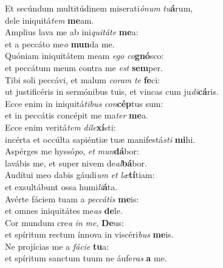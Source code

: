 \evenverse Et secúndum multitúdinem miserati\textit{ó}\textit{num} \textit{tu}\textbf{á}rum,~\*\\
\evenverse dele iniquitá\textit{tem} \textbf{me}am.\\
\oddverse Amplius lava me ab ini\textit{qui}\textit{tá}\textit{te} \textbf{me}a:~\*\\
\oddverse et a peccáto me\textit{o} \textbf{mun}da me.\\
\evenverse Quóniam iniquitátem meam \textit{e}\textit{go} \textit{co}\textbf{gnó}sco:~\*\\
\evenverse et peccátum meum contra me \textit{est} \textbf{sem}per.\\
\oddverse Tibi soli peccávi, et malum \textit{co}\textit{ram} \textit{te} \textbf{fe}ci:~\*\\
\oddverse ut justificéris in sermónibus tuis, et vincas cum ju\textit{di}\textbf{cá}ris.\\
\evenverse Ecce enim in iniquitá\textit{ti}\textit{bus} \textit{con}\textbf{cép}tus sum:~\*\\
\evenverse et in peccátis concépit me ma\textit{ter} \textbf{me}a.\\
\oddverse Ecce enim veritá\textit{tem} \textit{di}\textit{le}\textbf{xí}sti:~\*\\
\oddverse incérta et occúlta sapiéntiæ tuæ manifestá\textit{sti} \textbf{mi}hi.\\
\evenverse Aspérges me hyssó\textit{po}, \textit{et} \textit{mun}\textbf{dá}bor:~\*\\
\evenverse lavábis me, et super nivem de\textit{al}\textbf{bá}bor.\\
\oddverse Audítui meo dabis gáudi\textit{um} \textit{et} \textit{læ}\textbf{tí}tiam:~\*\\
\oddverse et exsultábunt ossa humi\textit{li}\textbf{á}ta.\\
\evenverse Avérte fáciem tuam a \textit{pec}\textit{cá}\textit{tis} \textbf{me}is:~\*\\
\evenverse et omnes iniquitátes me\textit{as} \textbf{de}le.\\
\oddverse Cor mundum cre\textit{a} \textit{in} \textit{me}, \textbf{De}us:~\*\\
\oddverse et spíritum rectum ínnova in viscéri\textit{bus} \textbf{me}is.\\
\evenverse Ne projícias me a \textit{fá}\textit{ci}\textit{e} \textbf{tu}a:~\*\\
\evenverse et spíritum sanctum tuum ne áufe\textit{ras} \textbf{a} me.\\
